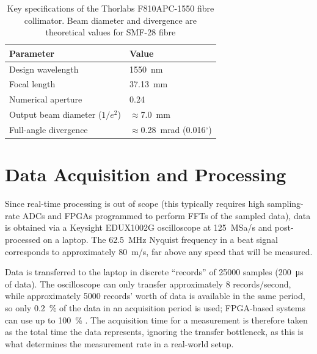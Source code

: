  \begin{table}[H]
 	\centering
 	
 	\begin{tabular}{@{}ll@{}}
 		\toprule
 		\textbf{Parameter} & \textbf{Value} \\
 		\midrule
 		Design wavelength              & 1550~nm \\
 		Focal length                   & 37.13~mm \\
 		Numerical aperture             & 0.24 \\
 		Output beam diameter ($1/e^2$) & $\approx$7.0~mm \\
 		Full-angle divergence          & $\approx$0.28~mrad (0.016$^\circ$) \\
 		\bottomrule
 	\end{tabular}
 	\caption{Key specifications of the Thorlabs F810APC-1550 fibre collimator. Beam diameter and divergence are theoretical values for SMF-28 fibre}
 	\label{tab:collimator}
 \end{table}
 
 \section{Data Acquisition and Processing}
 \label{sec:design-DataAcquisition}
 Since real-time processing is out of scope (this typically requires high sampling-rate ADCs and FPGAs programmed to perform FFTs of the sampled data), data is obtained via a Keysight EDUX1002G oscilloscope at \SI{125}{MSa/s} and post-processed on a laptop. The \SI{62.5}{MHz} Nyquist frequency in a beat signal corresponds to approximately \SI{80}{m/s}, far above any speed that will be measured.
 
 Data is transferred to the laptop in discrete ``records'' of \num{25000} samples (\SI{200}{\micro\second} of data). The oscilloscope can only transfer approximately 8 records/second, while approximately 5000 records' worth of data is available in the same period, so only \SI{0.2}{\percent} of the data in an acquisition period is used; FPGA-based systems can use up to \SI{100}{\percent} \cite{hill_remote_nodate}. The acquisition time for a measurement is therefore taken as the total time the data represents, ignoring the transfer bottleneck, as this is what determines the measurement rate in a real-world setup.
 
